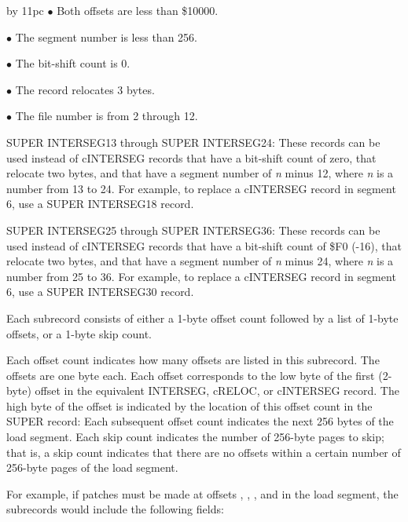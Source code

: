 \begingroup
\parskip=3pt\baselineskip=10pt
\advance\parindent by 11pc
{$\bullet$\enspace} Both offsets are less than \$10000.\par
{$\bullet$\enspace} The segment number is less than 256.\par
{$\bullet$\enspace} The bit-shift count is 0.\par
{$\bullet$\enspace} The record relocates 3 bytes.\par
{$\bullet$\enspace} The file number is from 2 through 12.\par
\endgroup

\bodybody
{\super SUPER INTERSEG13} through {\super SUPER INTERSEG24:} These records
can be used instead of {\omf cINTERSEG} records that have a bit-shift count
of zero, that relocate two bytes, and that have a segment number of {\it n}
minus 12, where {\it n} is a number from 13 to 24. For example, to replace a
{\omf cINTERSEG} record in segment 6, use a {\super SUPER INTERSEG18} record.

\bodybody
{\super SUPER INTERSEG25} through {\super SUPER INTERSEG36:} These records
can be used instead of {\omf cINTERSEG} records that have a bit-shift count
of \$F0 (-16), that relocate two bytes, and that have a segment number of
{\it n} minus 24, where {\it n} is a number from 25 to 36. For example, to
replace a {\omf cINTERSEG} record in segment 6, use a {\super SUPER
INTERSEG30} record.

\bodybody
Each subrecord consists of either a 1-byte offset count followed by a list of
1-byte offsets, or a 1-byte skip count.

\bodybody
Each offset count indicates how many offsets are listed in this subrecord.
The offsets are one byte each. Each offset corresponds to the low byte of the
first (2-byte) offset in the equivalent {\omf INTERSEG}, {\omf cRELOC}, or
{\omf cINTERSEG} record. The high byte of the offset is indicated by the
location of this offset count in the {\omf SUPER} record: Each subsequent
offset count indicates the next 256 bytes of the load segment. Each skip
count indicates the number of 256-byte pages to skip; that is, a skip count
indicates that there are no offsets within a certain number of 256-byte pages
of the load segment.

\bodybody
For example, if patches must be made at offsets {}, {},
{}, and {} in the load segment, the subrecords would
include the following fields:

\medskip

